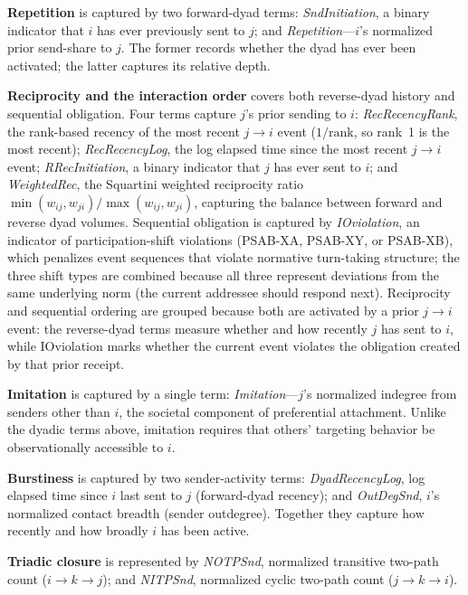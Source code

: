\documentclass[11pt]{article}
\begin{document}
\textbf{Repetition} is captured by two forward-dyad terms: \textit{SndInitiation},
a binary indicator that $i$ has ever previously sent to $j$; and
\textit{Repetition}---$i$'s normalized prior send-share to $j$. The former
records whether the dyad has ever been activated; the latter captures its
relative depth.

\textbf{Reciprocity and the interaction order} covers both reverse-dyad history
and sequential obligation. Four terms capture $j$'s prior sending to $i$:
\textit{RecRecencyRank}, the rank-based recency of the most recent $j \to i$
event ($1/\text{rank}$, so rank~1 is the most recent); \textit{RecRecencyLog},
the log elapsed time since the most recent $j \to i$ event;
\textit{RRecInitiation}, a binary indicator that $j$ has ever sent to $i$; and
\textit{WeightedRec}, the Squartini weighted reciprocity ratio
$\min(w_{ij}, w_{ji})/\max(w_{ij}, w_{ji})$, capturing the balance between
forward and reverse dyad volumes. Sequential obligation is captured by
\textit{IOviolation}, an indicator of participation-shift violations (PSAB-XA,
PSAB-XY, or PSAB-XB), which penalizes event sequences that violate normative
turn-taking structure; the three shift types are combined because all three
represent deviations from the same underlying norm (the current addressee should
respond next). Reciprocity and sequential ordering are grouped because both are
activated by a prior $j \to i$ event: the reverse-dyad terms measure whether and
how recently $j$ has sent to $i$, while IOviolation marks whether the current
event violates the obligation created by that prior receipt.

\textbf{Imitation} is captured by a single term: \textit{Imitation}---$j$'s
normalized indegree from senders other than $i$, the societal component of
preferential attachment. Unlike the dyadic terms above, imitation requires that
others' targeting behavior be observationally accessible to $i$.

\textbf{Burstiness} is captured by two sender-activity terms:
\textit{DyadRecencyLog}, log elapsed time since $i$ last sent to $j$ (forward-dyad
recency); and \textit{OutDegSnd}, $i$'s normalized contact breadth (sender
outdegree). Together they capture how recently and how broadly $i$ has been
active.

\textbf{Triadic closure} is represented by \textit{NOTPSnd}, normalized
transitive two-path count ($i \to k \to j$); and \textit{NITPSnd}, normalized
cyclic two-path count ($j \to k \to i$).
\end{document}
